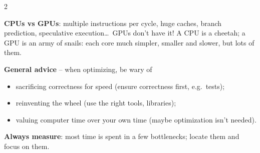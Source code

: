 \documentclass[a4paper,9pt]{extarticle}
\begin{document}
\begin{multicols}{2}
\begin{important}

\textbf{CPUs vs GPUs}: multiple instructions per cycle, huge caches, branch prediction,
speculative execution\dots\ GPUs don't have it! A CPU is a cheetah; a GPU is an army of snails:
each core much simpler, smaller and slower, but lots of them.

\end{important}


\begin{summary}

\textbf{General advice} -- when optimizing, be wary of

\begin{itemize}

\item sacrificing correctness for speed (ensure correctness first, e.g.\ tests);

\item reinventing the wheel (use the right tools, libraries);

\item valuing computer time over your own time (maybe optimization isn't needed).

\end{itemize}

\textbf{Always measure}: most time is spent in a few bottlenecks; locate them and focus on them.

\end{summary}



\end{multicols}
\end{document}
